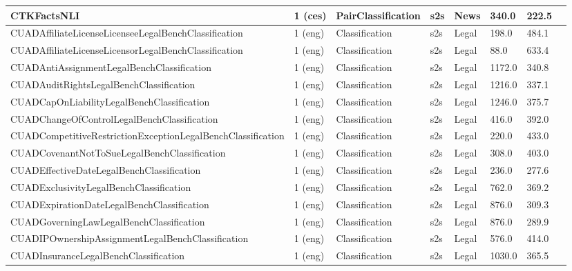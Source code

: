 \begin{longtable}{L{5.0cm}|L{1.5cm}L{1.4cm}L{1.4cm}L{1.4cm}L{1.4cm}L{1.0cm}L{1.0cm}}
 \hline 
CTKFactsNLI \cite{ullrich2023csfever} & 1 (ces) & PairClassification & s2s & News & 340.0 & 222.5 \\
 \hline 
CUADAffiliateLicenseLicenseeLegalBenchClassification \cite{guha2023legalbench} & 1 (eng) & Classification & s2s & Legal & 198.0 & 484.1 \\
 \hline 
CUADAffiliateLicenseLicensorLegalBenchClassification \cite{guha2023legalbench} & 1 (eng) & Classification & s2s & Legal & 88.0 & 633.4 \\
 \hline 
CUADAntiAssignmentLegalBenchClassification \cite{guha2023legalbench} & 1 (eng) & Classification & s2s & Legal & 1172.0 & 340.8 \\
 \hline 
CUADAuditRightsLegalBenchClassification \cite{guha2023legalbench} & 1 (eng) & Classification & s2s & Legal & 1216.0 & 337.1 \\
 \hline 
CUADCapOnLiabilityLegalBenchClassification \cite{guha2023legalbench} & 1 (eng) & Classification & s2s & Legal & 1246.0 & 375.7 \\
 \hline 
CUADChangeOfControlLegalBenchClassification \cite{guha2023legalbench} & 1 (eng) & Classification & s2s & Legal & 416.0 & 392.0 \\
 \hline 
CUADCompetitiveRestrictionExceptionLegalBenchClassification \cite{guha2023legalbench} & 1 (eng) & Classification & s2s & Legal & 220.0 & 433.0 \\
 \hline 
CUADCovenantNotToSueLegalBenchClassification \cite{guha2023legalbench} & 1 (eng) & Classification & s2s & Legal & 308.0 & 403.0 \\
 \hline 
CUADEffectiveDateLegalBenchClassification \cite{guha2023legalbench} & 1 (eng) & Classification & s2s & Legal & 236.0 & 277.6 \\
 \hline 
CUADExclusivityLegalBenchClassification \cite{guha2023legalbench} & 1 (eng) & Classification & s2s & Legal & 762.0 & 369.2 \\
 \hline 
CUADExpirationDateLegalBenchClassification \cite{guha2023legalbench} & 1 (eng) & Classification & s2s & Legal & 876.0 & 309.3 \\
 \hline 
CUADGoverningLawLegalBenchClassification \cite{guha2023legalbench} & 1 (eng) & Classification & s2s & Legal & 876.0 & 289.9 \\
 \hline 
CUADIPOwnershipAssignmentLegalBenchClassification \cite{guha2023legalbench} & 1 (eng) & Classification & s2s & Legal & 576.0 & 414.0 \\
 \hline 
CUADInsuranceLegalBenchClassification \cite{guha2023legalbench} & 1 (eng) & Classification & s2s & Legal & 1030.0 & 365.5 \\

\end{longtable}
